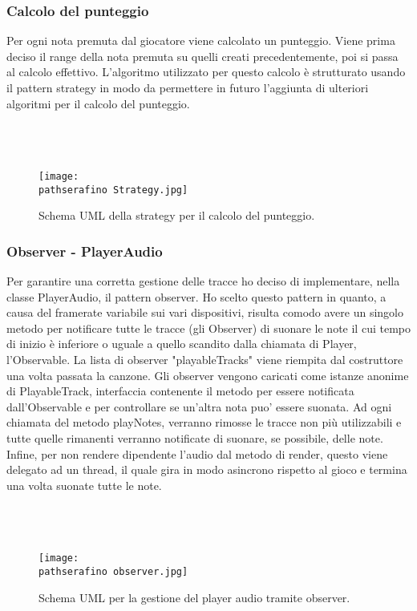 \documentclass[a4paper,12pt]{report}
\newcommand\pathserafino{img/serafino/}
\begin{document}
\subsubsection{Calcolo del punteggio}
Per ogni nota premuta dal giocatore viene calcolato un punteggio. Viene prima deciso il range della nota premuta su quelli creati precedentemente, poi si passa al calcolo effettivo. L'algoritmo utilizzato per questo calcolo è strutturato usando il pattern strategy in modo da permettere in futuro l'aggiunta di ulteriori algoritmi per il calcolo del punteggio. \\ \\ \\ \\
\begin{figure}[!htb]
	\centerline{\texttt{[image: \\pathserafino Strategy.jpg]}}
	\caption{Schema UML della strategy per il calcolo del punteggio.}
	\label{img:calcpunteggio}
\end{figure}
\clearpage \hfill\break

\subsubsection{Observer - PlayerAudio}
Per garantire una corretta gestione delle tracce ho deciso di implementare, nella classe PlayerAudio, il pattern observer. Ho scelto questo pattern in quanto, a causa del framerate variabile sui vari dispositivi, risulta comodo avere un singolo metodo per notificare tutte le tracce (gli Observer) di suonare le note il cui tempo di inizio è inferiore o uguale a quello scandito dalla chiamata di Player, l'Observable.
La lista di observer "playableTracks" viene riempita dal costruttore una volta passata la canzone. Gli observer vengono caricati come istanze anonime di PlayableTrack, interfaccia contenente il metodo per essere notificata dall'Observable e per controllare se un'altra nota puo' essere suonata.
Ad ogni chiamata del metodo playNotes, verranno rimosse le tracce non più utilizzabili e tutte quelle rimanenti verranno notificate di suonare, se possibile, delle note.
Infine, per non rendere dipendente l'audio dal metodo di render, questo viene delegato ad un thread, il quale gira in modo asincrono rispetto al gioco e termina una volta suonate tutte le note.
 \\ \\ \\ \\
\begin{figure}[!htb]
	\centerline{\texttt{[image: \\pathserafino observer.jpg]}}
	\caption{Schema UML per la gestione del player audio tramite observer.}
	\label{img:observer}
\end{figure}
\clearpage \hfill\break
\end{document}
